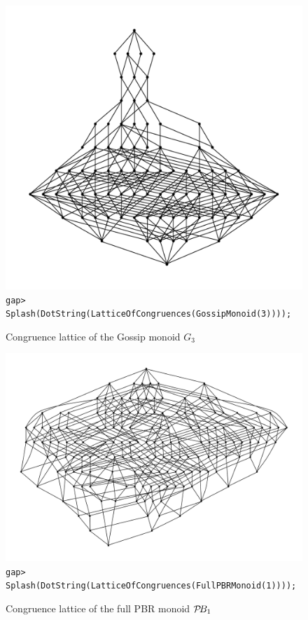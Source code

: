 \begin{figure}[h]
  \centering
  \includegraphics[width=\textwidth]{pics/ch-lattice/gossip3.pdf}
  \texttt{gap> Splash(DotString(LatticeOfCongruences(GossipMonoid(3))));}
  \caption[Congruence lattice of the Gossip monoid $G_3$]
  {Congruence lattice of the Gossip monoid $G_3$ \cite[\S2]{gossip}}
  \label{fig:g3-lattice}
\end{figure}

\begin{figure}[h]
  \centering
  \includegraphics[width=\textwidth]{pics/ch-lattice/pbr1.pdf}
  \texttt{gap> Splash(DotString(LatticeOfCongruences(FullPBRMonoid(1))));}
  \caption[Congruence lattice of the full PBR monoid $\PBR_1$]
  {Congruence lattice of the full PBR monoid $\PBR_1$
    \cite[\S2.1]{diagram_semigroups}}
  \label{fig:pbr1-lattice}
\end{figure}

